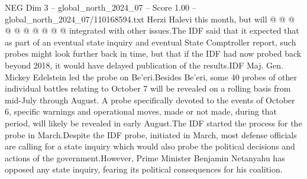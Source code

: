 \begin{textsample}{NEG Dim 3 – global\_north\_2024\_07 – Score 1.00 – global\_north\_2024\_07/110168594.txt}
Herzi Halevi this month, but will @ @ @ @ @ @ @ @ @ @ integrated with other issues.The IDF said that it expected that as part of an eventual state inquiry and eventual State Comptroller report, such probes might look further back in time, but that if the IDF had now probed back beyond 2018, it would have delayed publication of the results.IDF Maj.
Gen.
Mickey Edelstein led the probe on Be'eri.Besides Be'eri, some 40 probes of other individual battles relating to October 7 will be revealed on a rolling basis from mid-July through August.
A probe specifically devoted to the events of October 6, specific warnings and operational moves, made or not made, during that period, will likely be revealed in early August.The IDF started the process for the probe in March.Despite the IDF probe, initiated in March, most defense officials are calling for a state inquiry which would also probe the political decisions and actions of the government.However, Prime Minister Benjamin Netanyahu has opposed any state inquiry, fearing its political consequences for his coalition.

\end{textsample}
